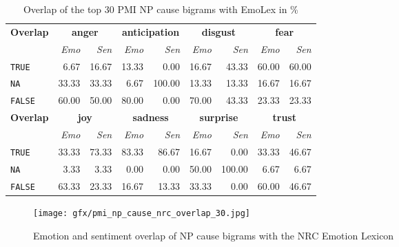 \begin{table}[]
\centering
\begin{tabular}{l|rr|rr|rr|rr}
{\bf Overlap} & \multicolumn{2}{c}{{\bf anger}} & \multicolumn{2}{c}{{\bf anticipation}} & \multicolumn{2}{c}{{\bf disgust}} & \multicolumn{2}{c}{{\bf fear}} \\
 & {\it Emo} & {\it Sen} & {\it Emo} & {\it Sen} & {\it Emo} & {\it Sen} & {\it Emo} & {\it Sen} \\\hline
\texttt{TRUE} & 6.67 & 16.67 & 13.33 & 0.00 & 16.67 & 43.33 & 60.00 & 60.00 \\
\texttt{NA} & 33.33 & 33.33 & 6.67 & 100.00 & 13.33 & 13.33 & 16.67 & 16.67 \\
\texttt{FALSE} & 60.00 & 50.00 & 80.00 & 0.00 & 70.00 & 43.33 & 23.33 & 23.33 \\\hline
{\bf Overlap} & \multicolumn{2}{c}{{\bf joy}} & \multicolumn{2}{c}{{\bf sadness}} & \multicolumn{2}{c}{{\bf surprise}} & \multicolumn{2}{c}{{\bf trust}} \\
 & {\it Emo} & {\it Sen} & {\it Emo} & {\it Sen} & {\it Emo} & {\it Sen} & {\it Emo} & {\it Sen} \\\hline
\texttt{TRUE} & 33.33 & 73.33 & 83.33 & 86.67 & 16.67 & 0.00 & 33.33 & 46.67 \\
\texttt{NA} & 3.33 & 3.33 & 0.00 & 0.00 & 50.00 & 100.00 & 6.67 & 6.67 \\
\texttt{FALSE} & 63.33 & 23.33 & 16.67 & 13.33 & 33.33 & 0.00 & 60.00 & 46.67
\end{tabular}
\caption{Overlap of the top 30 PMI NP cause bigrams with EmoLex in \%}
\label{tab:np-cause-nrc-overlap}
\end{table}

\begin{figure}[bth]
\texttt{[image: gfx/pmi\_np\_cause\_nrc\_overlap\_30.jpg]}
\caption{Emotion and sentiment overlap of NP cause bigrams with the NRC Emotion Lexicon}\label{fig:pmi-np-cause-nrc-overlap}
\end{figure}


